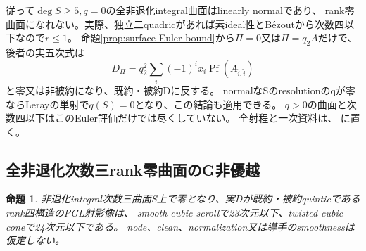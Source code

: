 \documentclass[a4paper,11pt]{ltjsarticle}
\newtheorem{proposition}{命題}[section]
\theoremstyle{definition}
\begin{document}
従って$\deg S\ge5,q=0$の全非退化integral曲面はlinearly normalであり、
rank零曲面になれない。実際、独立二quadricがあれば素ideal性とBézoutから次数四以下なので$r\le1$。
命題\ref{prop:surface-Euler-bound}から$\Pi=0$又は$\Pi=q_2A$だけで、後者の実五次式は
\[
 D_\Pi=q_2^2\sum_i(-1)^ix_i\operatorname{Pf}(A_{\widehat i,\widehat i})
\]
と零又は非被約になり、既約・被約Dに反する。
normalなSのresolutionのqが零ならLerayの単射で$q(S)=0$となり、この結論も適用できる。
$q>0$の曲面と次数四以下はこのEuler評価だけでは尽くしていない。
全射程と一次資料は、
に置く。

\subsection{全非退化次数三rank零曲面のG非優越}
\begin{proposition}\label{prop:degree-three-rank-zero-G}
非退化integral次数三曲面S上で零となり、実Dが既約・被約quinticであるrank四構造のPGL射影像は、
smooth cubic scrollで23次元以下、twisted cubic coneで24次元以下である。
node、clean、normalization又は導手のsmoothnessは仮定しない。
\end{proposition}
\end{document}
